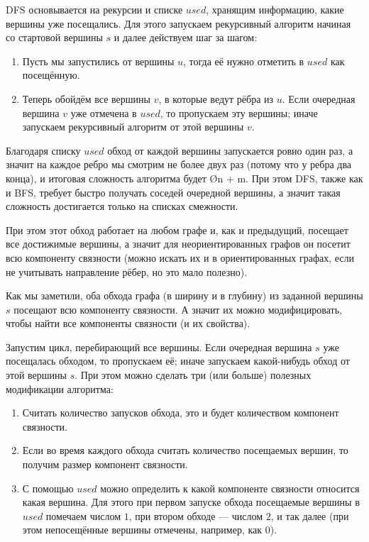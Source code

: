 DFS основывается на рекурсии и списке $used$, хранящим информацию, какие вершины уже посещались. Для этого запускаем рекурсивный алгоритм начиная со стартовой вершины $s$ и далее действуем шаг за шагом:

\begin{enumerate}
    \item Пусть мы запустились от вершины $u$, тогда её нужно отметить в $used$ как посещённую.
    \item Теперь обойдём все вершины $v$, в которые ведут рёбра из $u$. Если очередная вершина $v$ уже отмечена в $used$, то пропускаем эту вершины; иначе запускаем рекурсивный алгоритм от этой вершины $v$.
\end{enumerate}

Благодаря списку $used$ обход от каждой вершины запускается ровно один раз, а значит на каждое ребро мы смотрим не более двух раз (потому что у ребра два конца), и итоговая сложность алгоритма будет \O{n + m}. При этом DFS, также как и BFS, требует быстро получать соседей очередной вершины, а значит такая сложность достигается только на списках смежности.

При этом этот обход работает на любом графе и, как и предыдущий, посещает все достижимые вершины, а значит для неориентированных графов он посетит всю компоненту связности (можно искать их и в ориентированных графах, если не учитывать направление рёбер, но это мало полезно).


Как мы заметили, оба обхода графа (в ширину и в глубину) из заданной вершины $s$ посещают всю компоненту связности. А значит их можно модифицировать, чтобы найти все компоненты связности (и их свойства).

Запустим цикл, перебирающий все вершины. Если очередная вершина $s$ уже посещалась обходом, то пропускаем её; иначе запускаем какой-нибудь обход от этой вершины $s$. При этом можно сделать три (или больше) полезных модификации алгоритма:

\begin{enumerate}
    \item Считать количество запусков обхода, это и будет количеством компонент связности.
    \item Если во время каждого обхода считать количество посещаемых вершин, то получим размер компонент связности.
    \item С помощью $used$ можно определить к какой компоненте связности относится какая вершина. Для этого при первом запуске обхода посещаемые вершины в $used$ помечаем числом $1$, при втором обходе — числом $2$, и так далее (при этом непосещённые вершины отмечены, например, как $0$).
\end{enumerate}


